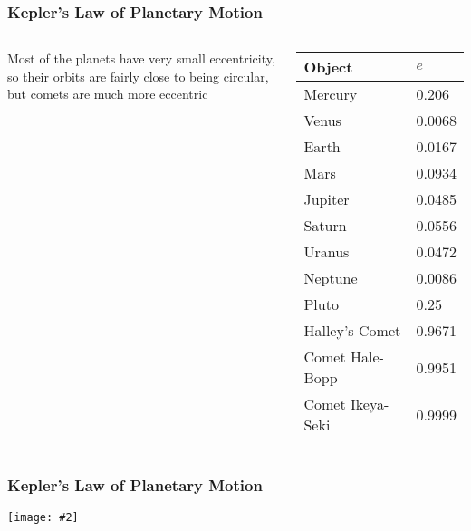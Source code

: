 \documentclass[12pt,compress,aspectratio=169]{beamer}
\newcommand{\pic}[2]{\texttt{[image: \#2]}}
\begin{document}
\begin{frame}
  \frametitle{Kepler's Law of Planetary Motion}
  \begin{columns}
    Most of the planets have very small eccentricity, so their orbits are
    fairly close to being circular, but comets are much more eccentric
    \begin{tabular}{l|l}
      \rowcolor{pink}
      \textbf{Object} & $e$ \\ \hline
      Mercury	& \num{0.206} \\
      Venus	& \num{0.0068} \\
      Earth	& \num{0.0167} \\
      Mars	& \num{0.0934} \\
      Jupiter	& \num{0.0485} \\
      Saturn	& \num{0.0556} \\
      Uranus	& \num{0.0472} \\
      Neptune	& \num{0.0086} \\
      Pluto	& \num{0.25} \\ \hline
      Halley's Comet   & \num{0.9671} \\
      Comet Hale-Bopp  & \num{0.9951} \\
      Comet Ikeya-Seki & \num{0.9999}
    \end{tabular}
  \end{columns}
\end{frame}

\begin{frame}
  \frametitle{Kepler's Law of Planetary Motion}
  \begin{center}
    \pic{.4}{kep5.png}
  \end{center}
\end{frame}
\end{document}
